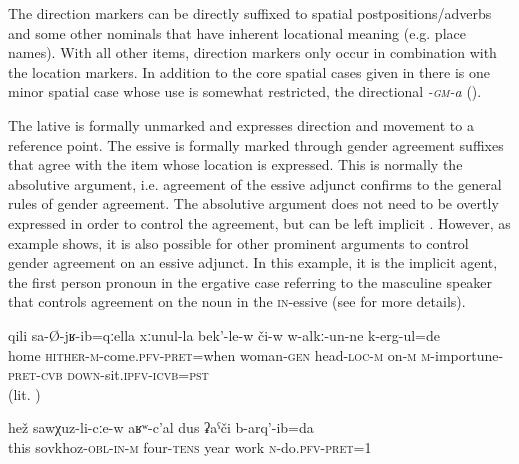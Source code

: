 The direction markers can be directly suffixed to spatial postpositions/adverbs and some other nominals that have inherent locational meaning (e.g. place names). With all other items, direction markers only occur in combination with the location markers. In addition to the core spatial cases given in  there is one minor spatial case whose use is somewhat restricted, the directional \textit{-\textsc{gm}-a} (). 

%
%


The lative is formally unmarked and expresses direction and movement to a reference point. The essive is formally marked through gender agreement suffixes that agree with the item whose location is expressed. This is normally the absolutive argument, i.e. agreement of the essive adjunct confirms to the general rules of gender agreement. The absolutive argument does not need to be overtly expressed in order to control the agreement, but can be left implicit . However, as example  shows, it is also possible for other prominent arguments to control gender agreement on an essive adjunct. In this example, it is the implicit agent, the first person pronoun in the ergative case referring to the masculine speaker that controls agreement on the noun in the \textsc{in}-essive (see  for more details). 
%
\begin{exe}
	\ex	\label{ex:when he came come, he pestered his wife}
	\gll	qili	sa-Ø-jʁ-ib=qːella	xːunul-la	bek'-le-w	či-w	w-alkː-un-ne	k-erg-ul=de\\
		home	\textsc{hither-m}-come.\textsc{pfv}-\textsc{pret}=when	woman-\textsc{gen} head-\textsc{loc}-\textsc{m} on-\textsc{m} \textsc{m-}importune-\textsc{pret}-\textsc{cvb} \textsc{down}-sit.\textsc{ipfv}-\textsc{icvb}=\textsc{pst}\\
	\glt	{} (lit. )

	\ex	\label{ex:In the sovkhoz I worked for 40 years}
	\gll	hež	sawχuz-li-cːe-w	aʁʷ-c'al	dus	ʡaˁči	b-arq'-ib=da \\
		this	sovkhoz-\textsc{obl}-\textsc{in}-\textsc{m}	four-\textsc{tens}	year	work	\textsc{n}-do.\textsc{pfv}-\textsc{pret}=1\\
	\glt	{}
\end{exe} 

